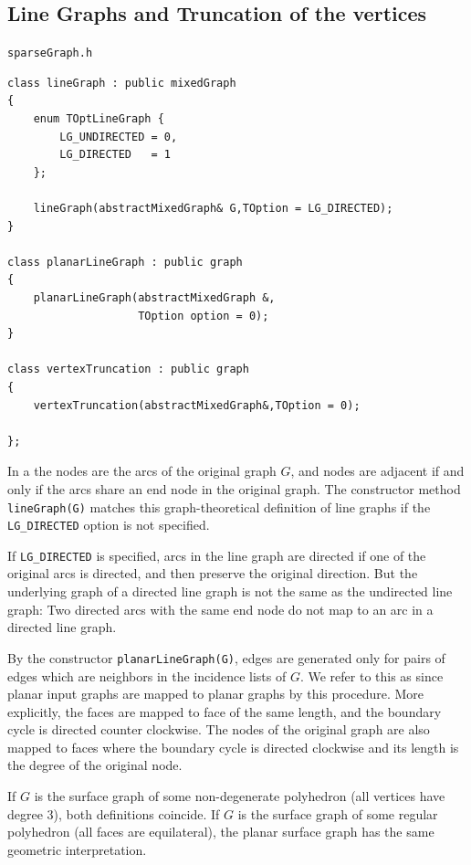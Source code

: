 \documentclass[a4paper,11pt,twoside]{book}
\begin{document}
\begin{multicols}{2}
\subsection{Line Graphs and Truncation of the vertices}
\label{sbl_line_graph}
\myinclude\verb/sparseGraph.h/
\begin{mymethods}
\begin{verbatim}
class lineGraph : public mixedGraph
{
    enum TOptLineGraph {
        LG_UNDIRECTED = 0,
        LG_DIRECTED   = 1
    };

    lineGraph(abstractMixedGraph& G,TOption = LG_DIRECTED);
}

class planarLineGraph : public graph
{
    planarLineGraph(abstractMixedGraph &,
                    TOption option = 0);
}

class vertexTruncation : public graph
{
    vertexTruncation(abstractMixedGraph&,TOption = 0);

};
\end{verbatim}
\end{mymethods}
In a  the nodes are the arcs of the original graph $G$, and nodes
are adjacent if and only if the arcs share an end node in the original graph.
The constructor method \verb/lineGraph(G)/ matches this graph-theoretical definition
of line graphs if the \verb/LG_DIRECTED/ option is not specified.

If \verb/LG_DIRECTED/ is specified, arcs in the line graph are directed if one of
the original arcs is directed, and then preserve the original direction. But the
underlying graph of a directed line graph is not the same as the undirected line
graph: Two directed arcs with the same end node do not map to an arc in a directed
line graph.

By the constructor \verb/planarLineGraph(G)/, edges are generated only for
pairs of edges which are neighbors in the incidence lists of $G$. We refer to
this as  since planar input graphs are mapped to planar
graphs by this procedure. More explicitly, the faces are mapped to face of the same
length, and the boundary cycle is directed counter clockwise. The nodes of the
original graph are also mapped to faces where the boundary cycle is directed
clockwise and its length is the degree of the original node.

If $G$ is the surface graph of some non-degenerate polyhedron (all vertices have
degree 3), both definitions coincide. If $G$ is the surface graph of some regular
polyhedron (all faces are equilateral), the planar surface graph has the same
geometric interpretation.


\end{multicols}
\end{document}
